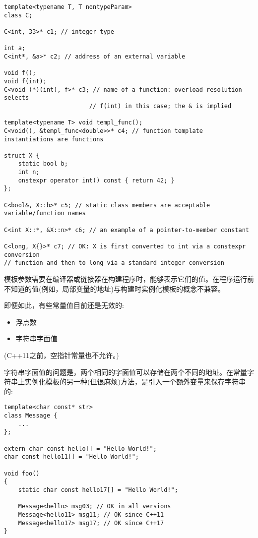 \begin{lstlisting}[style=styleCXX]
template<typename T, T nontypeParam>
class C;

C<int, 33>* c1; // integer type

int a;
C<int*, &a>* c2; // address of an external variable

void f();
void f(int);
C<void (*)(int), f>* c3; // name of a function: overload resolution selects
						// f(int) in this case; the & is implied

template<typename T> void templ_func();
C<void(), &templ_func<double>>* c4; // function template instantiations are functions

struct X {
	static bool b;
	int n;
	onstexpr operator int() const { return 42; }
};

C<bool&, X::b>* c5; // static class members are acceptable variable/function names

C<int X::*, &X::n>* c6; // an example of a pointer-to-member constant

C<long, X{}>* c7; // OK: X is first converted to int via a constexpr conversion
// function and then to long via a standard integer conversion
\end{lstlisting}

模板参数需要在编译器或链接器在构建程序时，能够表示它们的值。在程序运行前不知道的值(例如，局部变量的地址)与构建时实例化模板的概念不兼容。

即便如此，有些常量值目前还是无效的:

\begin{itemize}
\item 
浮点数

\item 
字符串字面值
\end{itemize}

(C++11之前，空指针常量也不允许。)

字符串字面值的问题是，两个相同的字面值可以存储在两个不同的地址。在常量字符串上实例化模板的另一种(但很麻烦)方法，是引入一个额外变量来保存字符串的:

\begin{lstlisting}[style=styleCXX]
template<char const* str>
class Message {
	...
};

extern char const hello[] = "Hello World!";
char const hello11[] = "Hello World!";

void foo()
{
	static char const hello17[] = "Hello World!";
	
	Message<hello> msg03; // OK in all versions
	Message<hello11> msg11; // OK since C++11
	Message<hello17> msg17; // OK since C++17
}
\end{lstlisting}

